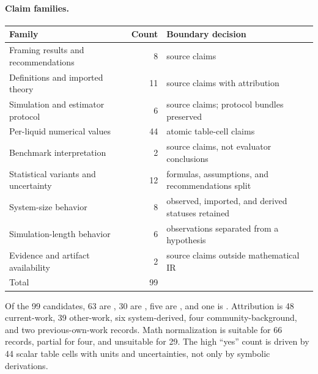 \paragraph{Claim families.}
\begin{center}
\begin{tabular}{lrl}
\toprule
Family & Count & Boundary decision \\
\midrule
Framing results and recommendations & 8 & source claims \\
Definitions and imported theory & 11 & source claims with attribution \\
Simulation and estimator protocol & 6 & source claims; protocol bundles preserved \\
Per-liquid numerical values & 44 & atomic table-cell claims \\
Benchmark interpretation & 2 & source claims, not evaluator conclusions \\
Statistical variants and uncertainty & 12 & formulas, assumptions, and recommendations split \\
System-size behavior & 8 & observed, imported, and derived statuses retained \\
Simulation-length behavior & 6 & observations separated from a hypothesis \\
Evidence and artifact availability & 2 & source claims outside mathematical IR \\
\midrule
Total & 99 & \\
\bottomrule
\end{tabular}
\end{center}

Of the 99 candidates, 63 are , 30 are , five are , and one is . Attribution is 48 current-work, 39 other-work, six system-derived, four community-background, and two previous-own-work records. Math normalization is suitable for 66 records, partial for four, and unsuitable for 29. The high ``yes'' count is driven by 44 scalar table cells with units and uncertainties, not only by symbolic derivations.

